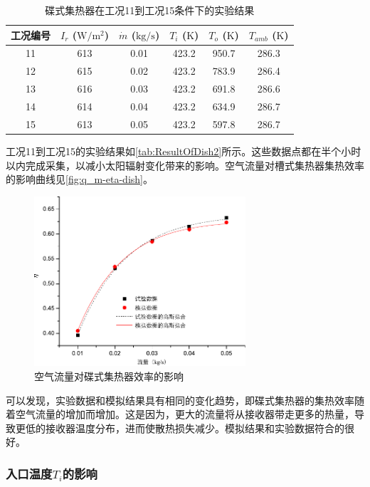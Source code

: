 \begin{table}[htbp]
	\caption{碟式集热器在工况11到工况15条件下的实验结果}
	\centering
	\begin{tabular}{cccccc}
		\toprule
		工况编号	& $I_r$ ($\mathrm{W/m^2}$)	&	$\dot{m}$ ($\mathrm{kg/s}$)			&	$T_i$ ($\mathrm{K}$)	&	$T_o$ ($\mathrm{K}$)		&	$T_{amb}$ ($\mathrm{K}$)\\
		\midrule
		11	&	613	&	0.01	&	423.2	&	950.7	&	286.3\\
		12	&	615	&	0.02	&	423.2	&	783.9	&	286.4\\
		13	&	616	&	0.03	&	423.2	&	691.8	&	286.6	\\
		14	&	614	&	0.04	&	423.2	&	634.9	&	286.7\\
		15	&	613	&	0.05	&	423.2	&	597.8	&	286.7\\
		\bottomrule
	\end{tabular}
	\label{tab:ResultOfDish2}
\end{table}
工况11到工况15的实验结果如\autoref{tab:ResultOfDish2}所示。这些数据点都在半个小时以内完成采集，以减小太阳辐射变化带来的影响。空气流量对槽式集热器集热效率的影响曲线见\autoref{fig:q_m-eta-dish}。

\begin{figure}[!ht]
\centering
\includegraphics[width=0.7\textwidth]{fig/q_m-eta-dish}
\caption{空气流量对碟式集热器效率的影响}
\label{fig:q_m-eta-dish}
\end{figure}

可以发现，实验数据和模拟结果具有相同的变化趋势，即碟式集热器的集热效率随着空气流量的增加而增加。这是因为，更大的流量将从接收器带走更多的热量，导致更低的接收器温度分布，进而使散热损失减少。模拟结果和实验数据符合的很好。

\subsubsection{入口温度$T_i$的影响}

